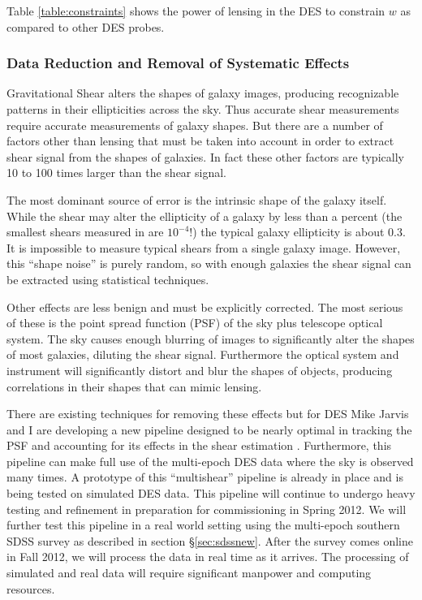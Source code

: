 \documentclass[12pt]{article}
\newcommand{\commissdate}{Fall 2012}
\begin{document}
Table \ref{table:constraints} shows the power of lensing in the DES to
constrain $w$ as compared to other DES probes.

\subsubsection{Data Reduction and Removal of Systematic Effects} 
\label{sec:des:process}

Gravitational Shear alters the shapes of galaxy images, producing recognizable
patterns in their ellipticities across the sky. Thus accurate shear
measurements require accurate measurements of galaxy shapes.  But there are a
number of factors other than lensing that must be taken into account in order
to extract shear signal from the shapes of galaxies. In fact these other
factors are typically 10 to 100 times larger than the shear signal.

The most dominant source of error is the intrinsic shape of the galaxy itself.
While the shear may alter the ellipticity of a galaxy by less than a percent
(the smallest shears measured in \cite{SheldonLensing07} are $10^{-4}$!) the
typical galaxy ellipticity is about 0.3.  It is impossible to measure typical
shears from a single galaxy image.  However, this ``shape noise'' is purely
random, so with enough galaxies the shear signal can be extracted using
statistical techniques.

Other effects are less benign and must be explicitly corrected.  The most
serious of these is the point spread function (PSF) of the sky plus telescope
optical system. The sky causes enough blurring of images to significantly alter
the shapes of most galaxies, diluting the shear signal.  Furthermore the
optical system and instrument will significantly distort and blur the shapes of
objects, producing correlations in their shapes that can mimic lensing.

There are existing techniques for removing these effects but for DES Mike
Jarvis and I are developing a new pipeline designed to be nearly optimal in
tracking the PSF and accounting for its effects in the shear estimation
\cite{Bern02,JarvisJain04}.  Furthermore, this pipeline can make full use of
the multi-epoch DES data where the sky is observed many times.  A prototype of
this ``multishear'' pipeline is already in place and is being tested on
simulated DES data.  This pipeline will continue to undergo heavy testing and
refinement in preparation for commissioning in Spring 2012.  We will further
test this pipeline in a real world setting using the multi-epoch southern SDSS
survey as described in section \S \ref{sec:sdssnew}.  After the survey comes
online in \commissdate, we will process the data in real time as it arrives.
The processing of simulated and real data will require significant manpower and
computing resources.
\end{document}
